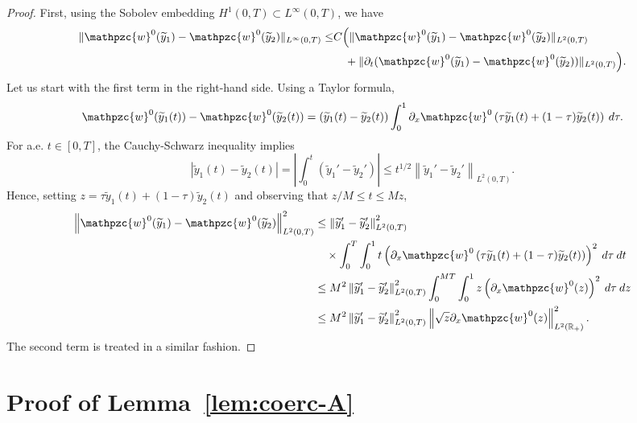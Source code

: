 \documentclass[AHL,Unicode,longabstracts,published]{cedram}
\newcommand{\R}{\mathbb{R}}
\newcommand{\p}{\partial}
\newcommand{\tw}{\mathpzc{w}}
\newcommand{\ty}{\widetilde{y}}
\begin{document}
\begin{proof}
First, using the Sobolev embedding $H^1(0,T)\subset L^\infty(0,T)$, we have
\begin{align*}
\|\tw^0 (\ty_1)- \tw^0(\ty_2)\|_{L^\infty(0,T)} \leq &C \Big(\|\tw^0 (\ty_1)- \tw^0(\ty_2)\|_{L^2(0,T)} \\&\quad+ \|\p_t (\tw^0 (\ty_1)- \tw^0(\ty_2))\|_{L^2(0,T)}\Big).
\end{align*}
Let us start with the first term in the right-hand side. Using a Taylor formula,
\[
\tw^0 (\ty_1(t))- \tw^0(\ty_2(t))=(\ty_1(t)-\ty_2(t))\int_0^1 \p_x \tw^0\left(\tau \ty_1(t) + (1-\tau) \ty_2(t)\right)\:d\tau.
\]
For a.e. $t\in [0,T]$, the Cauchy-Schwarz inequality implies
\[
\left|\ty_1(t)-\ty_2(t)\right|=\left| \int_0^t \left(\ty_1'-\ty_2'\right)\right|\leq t^{1/2}\left\|\ty_1'-\ty_2'\right\|_{L^2(0,T)}.
\]
Hence, setting $z=\tau \ty_1(t) + (1-\tau) \ty_2(t)$ and observing that $z/M\leq t\leq Mz$,
\begin{align*}
\left\|\tw^0 (\ty_1)- \tw^0(\ty_2)\right\|_{L^2(0,T)}^2&\leq \left\|\ty_1'-\ty_2'\right\|_{L^2(0,T)}^2 \\
&\quad\times \int_0^T\int_0^1 t \left(\p_x \tw^0\left(\tau \ty_1(t) + (1-\tau) \ty_2(t)\right)\right)^2\:d\tau\:dt\\
&\leq M^2 \left\|\ty_1'-\ty_2'\right\|_{L^2(0,T)}^2 \int_0^{MT}\int_0^1 z \left(\p_x \tw^0(z)\right)^2 \:d\tau\:dz\\
&\leq M^2\left\|\ty_1'-\ty_2'\right\|_{L^2(0,T)}^2\left\| \sqrt{z} \p_x \tw^0(z)\right\|_{L^2(\R_+)}^2.
\end{align*}
The second term is treated in a similar fashion.
\end{proof}

\section{Proof of Lemma~\ref{lem:coerc-A}}\label{app:lem:coerc-A}
\end{document}
